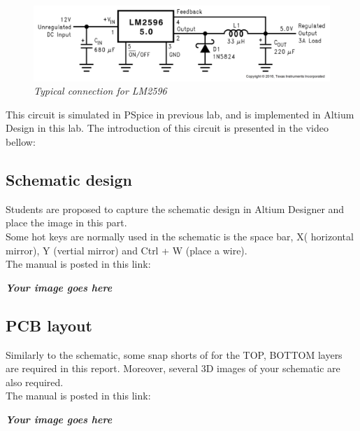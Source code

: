 \begin{figure}[!htp]
    \centering
    \includegraphics[width=5in]{source/picture/bai_4/LM2596.PNG}
    \caption{\textit{Typical connection for LM2596}}
    \label{bai4_pic3}
\end{figure}

This circuit is simulated in PSpice in previous lab, and is implemented in Altium Design in this lab. The introduction of this circuit is presented in the video bellow:
\begin{center}
\end{center}
\subsection{Schematic design}
Students are proposed to capture the schematic design in Altium Designer and place the image in this part.\\

Some hot keys are normally used in the schematic is the space bar, X( horizontal mirror), Y (vertial mirror) and Ctrl + W (place a wire).\\

The manual is posted in this link:

\begin{center}
\end{center}


\textbf{\textit{Your image goes here}}

\subsection{PCB layout}
Similarly to the schematic, some snap shorts of for the TOP, BOTTOM layers are required in this report. Moreover, several 3D images of your schematic are also required.\\

The manual is posted in this link:\\

\begin{center}
\end{center}

\textbf{\textit{Your image goes here}}